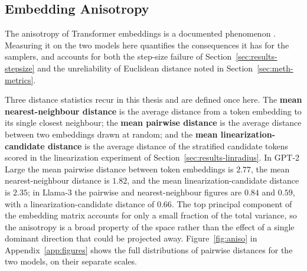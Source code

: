 \subsection{Embedding Anisotropy}
\label{sec:results-aniso}

The anisotropy of Transformer embeddings is a documented phenomenon \citep{gao2019representation, ethayarajh2019contextual}. Measuring it on the two models here quantifies the consequences it has for the samplers, and accounts for both the step-size failure of Section~\ref{sec:results-stepsize} and the unreliability of Euclidean distance noted in Section~\ref{sec:meth-metrics}.

Three distance statistics recur in this thesis and are defined once here. The \textbf{mean nearest-neighbour distance} is the average distance from a token embedding to its single closest neighbour; the \textbf{mean pairwise distance} is the average distance between two embeddings drawn at random; and the \textbf{mean linearization-candidate distance} is the average distance of the stratified candidate tokens scored in the linearization experiment of Section~\ref{sec:results-linradius}. In GPT-2 Large the mean pairwise distance between token embeddings is $2.77$, the mean nearest-neighbour distance is $1.82$, and the mean linearization-candidate distance is $2.35$; in Llama-3 the pairwise and nearest-neighbour figures are $0.84$ and $0.59$, with a linearization-candidate distance of $0.66$.
The top principal component of the embedding matrix accounts for only a small fraction of the total variance, so the anisotropy is a broad property of the space rather than the effect of a single dominant direction that could be projected away.
Figure~\ref{fig:aniso} in Appendix~\ref{app:figures} shows the full distributions of pairwise distances for the two models, on their separate scales.

